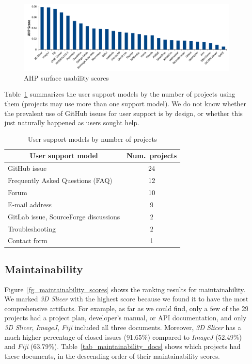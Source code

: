 \documentclass[final, 3p, times, authoryear]{elsarticle}
\begin{document}
\begin{figure}[!ht]
\includegraphics[scale=0.48]{figures/usability_scores.pdf}
\caption{AHP surface usability scores}
\label{fg_usability_scores}
\end{figure}
 
Table~\ref{tab_user_support_model} summarizes the user support models by the
number of projects using them (projects may use more than one support model). We
do not know whether the prevalent use of GitHub issues for user support is by
design, or whether this just naturally happened as users sought help.

\begin{table}[!ht]
\centering
\begin{tabular}{lc}
\toprule
\multicolumn{1}{c}{User support model} & Num.\ projects \\
\midrule
GitHub issue & 24 \\
Frequently Asked Questions (FAQ) & 12 \\
Forum & 10 \\
E-mail address & 9 \\
GitLab issue, SourceForge discussions & 2 \\
Troubleshooting & 2 \\
Contact form & 1 \\ 
\bottomrule
\end{tabular}
\caption{\label{tab_user_support_model}User support models by number of projects}
\end{table}

\subsection{Maintainability} \label{sec_score_maintainability}

Figure~\ref{fg_maintainability_scores} shows the ranking results for
maintainability. We marked \textit{3D Slicer} with the highest score because
we found it to have the most comprehensive artifacts. For example, as far as we
could find, only a few of the 29 projects had a project plan, developer's
manual, or API documentation, and only \textit{3D Slicer}, \textit{ImageJ},
\textit{Fiji} included all three documents. Moreover, \textit{3D Slicer} has a
much higher percentage of closed issues (91.65\%) compared to \textit{ImageJ}
(52.49\%) and \textit{Fiji} (63.79\%). Table~\ref{tab_maintainability_docs}
shows which projects had these documents, in the descending order of their
maintainability scores. 
\end{document}
